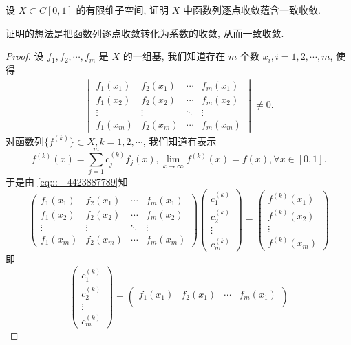 \documentclass[../../main.tex]{subfiles}
\begin{document}
\begin{example}
设 \( X \subset C[0,1] \) 的有限维子空间, 证明 \( X \) 中函数列逐点收敛蕴含一致收敛.
\end{example}
\begin{note}
证明的想法是把函数列逐点收敛转化为系数的收敛, 从而一致收敛.
\end{note}
\begin{proof}
设 \( f_1, f_2, \cdots, f_m \) 是 \( X \) 的一组基, 我们知道存在 \( m \) 个数 \( x_i, i = 1, 2, \cdots, m \), 使得
\begin{align}
\begin{vmatrix}
f_1(x_1) & f_2(x_1) & \cdots & f_m(x_1) \\
f_1(x_2) & f_2(x_2) & \cdots & f_m(x_2) \\
\vdots & \vdots & \ddots & \vdots \\
f_1(x_m) & f_2(x_m) & \cdots & f_m(x_m)
\end{vmatrix} \neq 0. \label{eq:::---4423887789}
\end{align}
对函数列\(\{f^{(k)}\} \subset X, k = 1, 2, \cdots \), 我们知道有表示
\[
f^{(k)}(x) = \sum_{j=1}^m c_j^{(k)} f_j(x), \lim_{k \to \infty} f^{(k)}(x) = f(x), \forall x \in [0,1].
\]
于是由 \eqref{eq:::---4423887789}知
\[
\begin{pmatrix}
f_1(x_1) & f_2(x_1) & \cdots & f_m(x_1) \\
f_1(x_2) & f_2(x_2) & \cdots & f_m(x_2) \\
\vdots & \vdots & \ddots & \vdots \\
f_1(x_m) & f_2(x_m) & \cdots & f_m(x_m)
\end{pmatrix}
\begin{pmatrix}
c_1^{(k)} \\
c_2^{(k)} \\
\vdots \\
c_m^{(k)}
\end{pmatrix}
=
\begin{pmatrix}
f^{(k)}(x_1) \\
f^{(k)}(x_2) \\
\vdots \\
f^{(k)}(x_m)
\end{pmatrix}
\]
即
\[
\begin{pmatrix}
c_1^{(k)} \\
c_2^{(k)} \\
\vdots \\
c_m^{(k)}
\end{pmatrix}
=
\begin{pmatrix}
f_1(x_1) & f_2(x_1) & \cdots & f_m(x_1) \\

\end{pmatrix}\]
\end{proof}
\end{document}
